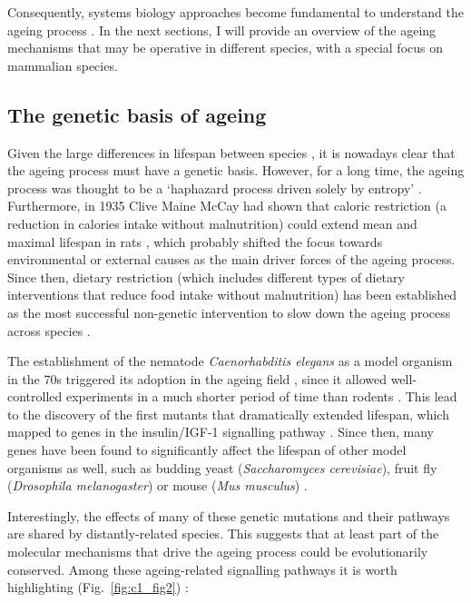 Consequently, systems biology approaches become fundamental to understand the ageing process \cite{Freund2019}. In the next sections, I will provide an overview of the ageing mechanisms that may be operative in different species, with a special focus on mammalian species. 

\smallskip

\subsection{The genetic basis of ageing} \label{s:1.1.2}

\smallskip

Given the large differences in lifespan between species \cite{Jones2013}, it is nowadays clear that the ageing process must have a genetic basis. However, for a long time, the ageing process was thought to be a `haphazard process driven solely by entropy' \cite{Kenyon2005}. Furthermore, in 1935 Clive Maine McCay had shown that caloric restriction (a reduction in calories intake without malnutrition) could extend mean and maximal lifespan in rats \cite{McCay1935,McDonald2010}, which probably shifted the focus towards environmental or external causes as the main driver forces of the ageing process. Since then, dietary restriction (which includes different types of dietary interventions that reduce food intake without malnutrition) has been established as the most successful non-genetic intervention to slow down the ageing process across species \cite{Fontana2015}.

\bigskip

The establishment of the nematode \textit{Caenorhabditis elegans} as a model organism in the 70s triggered its adoption in the ageing field \cite{KLASS1976}, since it allowed well-controlled experiments in a much shorter period of time than rodents \cite{Johnson2013}. This lead to the discovery of the first mutants that dramatically extended lifespan, which mapped to genes in the insulin/IGF-1 signalling pathway \cite{Kenyon1993,Morris1996}. Since then, many genes have been found to significantly affect the lifespan of other model organisms as well, such as budding yeast (\textit{Saccharomyces cerevisiae}), fruit fly (\textit{Drosophila melanogaster}) or mouse (\textit{Mus musculus}) \cite{Kenyon2005,Kenyon2010,Singh2019}. 

\bigskip

Interestingly, the effects of many of these genetic mutations and their pathways are shared by distantly-related species. This suggests that at least part of the molecular mechanisms that drive the ageing process could be evolutionarily conserved. Among these ageing-related signalling pathways it is worth highlighting (Fig.~\ref{fig:c1_fig2}) \cite{Kenyon2005,Kenyon2010,Singh2019,Greer2008}:

